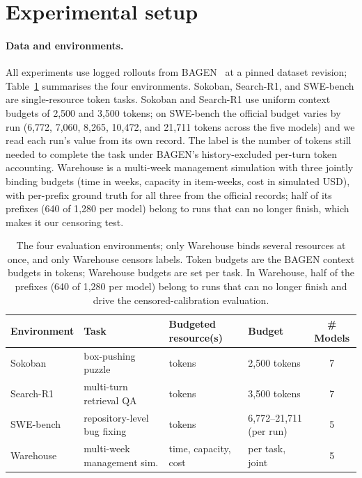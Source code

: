 \documentclass{article}
\begin{document}
\section{Experimental setup}
\label{sec:setup}

\paragraph{Data and environments.}
All experiments use logged rollouts from BAGEN~\cite{lin2026bagen} at a pinned dataset revision; Table~\ref{tab:envs} summarises the four environments. Sokoban, Search-R1, and SWE-bench are single-resource token tasks. Sokoban and Search-R1 use uniform context budgets of 2{,}500 and 3{,}500 tokens; on SWE-bench the official budget varies by run (6{,}772, 7{,}060, 8{,}265, 10{,}472, and 21{,}711 tokens across the five models) and we read each run's value from its own record. The label is the number of tokens still needed to complete the task under BAGEN's history-excluded per-turn token accounting. Warehouse is a multi-week management simulation with three jointly binding budgets (time in weeks, capacity in item-weeks, cost in simulated USD), with per-prefix ground truth for all three from the official records; half of its prefixes (640 of 1{,}280 per model) belong to runs that can no longer finish, which makes it our censoring test.

\begin{table}[t]
\centering
\caption{The four evaluation environments; only Warehouse binds several resources at once, and only Warehouse censors labels. Token budgets are the BAGEN context budgets in tokens; Warehouse budgets are set per task. In Warehouse, half of the prefixes (640 of 1{,}280 per model) belong to runs that can no longer finish and drive the censored-calibration evaluation.}
\label{tab:envs}
\small
\begin{tabular}{@{}llllc@{}}
\toprule
Environment & Task & Budgeted resource(s) & Budget & \# Models \\
\midrule
Sokoban & box-pushing puzzle & tokens & 2{,}500 tokens & 7 \\
Search-R1 & multi-turn retrieval QA & tokens & 3{,}500 tokens & 7 \\
SWE-bench & repository-level bug fixing & tokens & 6{,}772--21{,}711 (per run) & 5 \\
Warehouse & multi-week management sim. & time, capacity, cost & per task, joint & 5 \\
\bottomrule
\end{tabular}
\end{table}
\end{document}
